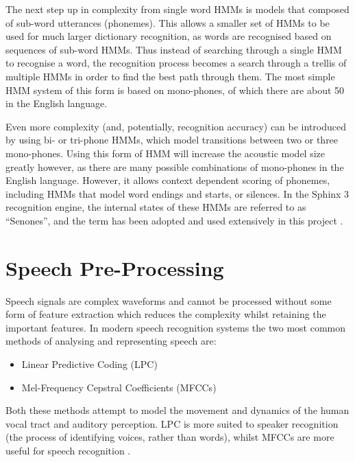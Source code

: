 		The next step up in complexity from single word HMMs is models that composed of sub-word utterances (phonemes).  This allows a smaller set of HMMs to be used for much larger dictionary recognition, as words are recognised based on sequences of sub-word HMMs.  Thus instead of searching through a single HMM to recognise a word, the recognition process becomes a search through a trellis of multiple HMMs in order to find the best path through them.  The most simple HMM system of this form is based on mono-phones, of which there are about 50 in the English language.

		Even more complexity (and, potentially, recognition accuracy) can be introduced by using bi- or tri-phone HMMs, which model transitions between two or three mono-phones.  Using this form of HMM will increase the acoustic model size greatly however, as there are many possible combinations of mono-phones in the English language.  However, it allows context dependent scoring of phonemes, including HMMs that model word endings and starts, or silences.  In the Sphinx 3 recognition engine, the internal states of these HMMs are referred to as ``Senones'', and the term has been adopted and used extensively in this project \cite{sphinx}.



\section{Speech Pre-Processing} %
\label{sec:speech_pre_processing}
	Speech signals are complex waveforms and cannot be processed without some form of feature extraction which reduces the complexity whilst retaining the important features.  In modern speech recognition systems the two most common methods of analysing and representing speech are: \cite{gaikwad2010review}
	\begin{itemize}
		\item Linear Predictive Coding (LPC)
		\item Mel-Frequency Cepstral Coefficients (MFCCs)
	\end{itemize}
	Both these methods attempt to model the movement and dynamics of the human vocal tract and auditory perception.  LPC is more suited to speaker recognition (the process of identifying voices, rather than words), whilst MFCCs are more useful for speech recognition \cite{sd2012interview}.

